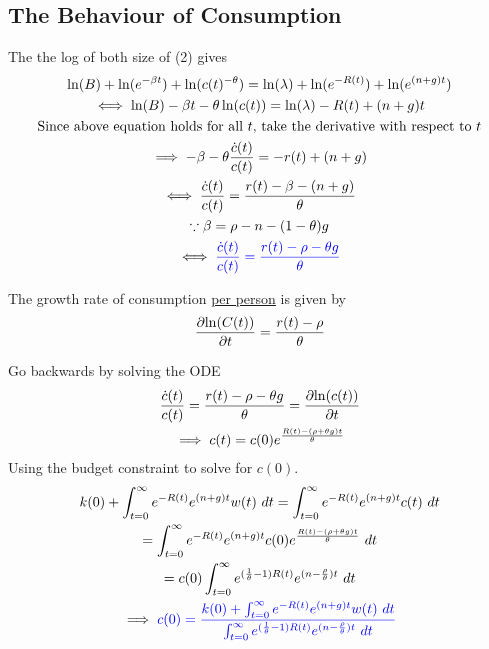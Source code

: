 \documentclass[]{article}
\begin{document}
		\subsection{The Behaviour of Consumption}
			\par The the log of both size of (2) gives 
			\begin{gather*}
				\ln(B) + \ln(e^{-\beta t}) + \ln(c(t)^{-\theta}) = \ln(\lambda) + \ln(e^{-R(t)}) + \ln(e^{(n+g)t}) \\
				\iff \ln(B) - \beta t - \theta \ln(c(t)) = \ln(\lambda) - R(t) + (n+g)t \\
				\text{{Since above equation holds for all $t$, take the derivative with respect to $t$}} \\
				\implies -\beta - \theta \frac{\dot{c}(t)}{c(t)} = -r(t) + (n+g) \\
				\iff \frac{\dot{c}(t)}{c(t)} = \frac{r(t) - \beta - (n + g)}{\theta} \\
				\because \beta = \rho - n - (1-\theta) g\\
				\iff 
				\textcolor{blue}{
					\frac{\dot{c}(t)}{c(t)} = \frac{r(t) - \rho - \theta g}{\theta}
				}
			\end{gather*}
			\begin{remark}
				The growth rate of consumption \ul{per person} is given by
				\begin{equation}
					\frac{\partial{\ln(C(t))}}{\partial{t}} = \frac{r(t)-\rho}{\theta}
				\end{equation}
			\end{remark}
			\begin{remark}
				Go backwards by solving the ODE
				\begin{gather*}
					\frac{\dot{c}(t)}{c(t)} = \frac{r(t) - \rho - \theta g}{\theta} = \frac{\partial{\ln(c(t))}}{\partial{t}} \\
					\implies c(t) = c(0) e^{\frac{R(t) - (\rho + \theta g)t}{\theta}}
				\end{gather*}
				Using the budget constraint to solve for $c(0)$.
				\begin{gather*}
					k(0) + \int_{t=0}^\infty {e^{-R(t)} e^{(n+g)t} w(t)\ dt} = \int_{t=0}^\infty {e^{-R(t)} e^{(n+g)t} c(t)\ dt} \\
					= \int_{t=0}^\infty {e^{-R(t)} e^{(n+g)t} c(0) e^{\frac{R(t) - (\rho + \theta g)t}{\theta}}}\ dt \\
					= c(0) \int_{t=0}^\infty e^{(\frac{1}{\theta} - 1)R(t)} e^{(n - \frac{\rho}{\theta})t} \ dt \\
					\implies
					\textcolor{blue}{
					c(0) = \frac{
					k(0) + \int_{t=0}^\infty {e^{-R(t)} e^{(n+g)t} w(t)\ dt}
					}{
					\int_{t=0}^\infty e^{(\frac{1}{\theta} - 1)R(t)} e^{(n - \frac{\rho}{\theta})t} \ dt
					}
					}
				\end{gather*}
			\end{remark}
\end{document}
